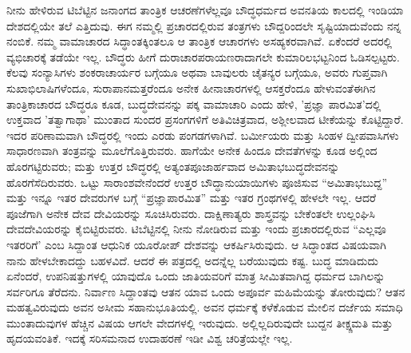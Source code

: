 ನೀನು ಹೇಳಿರುವ ಟಿಬೆಟ್ಟಿನ ಜನಾಂಗದ ತಾಂತ್ರಿಕ ಆಚರಣೆಗಳೆಲ್ಲವೂ ಬೌದ್ಧಧರ್ಮದ ಅವನತಿಯ ಕಾಲದಲ್ಲಿ ಇಂಡಿಯಾ ದೇಶದಲ್ಲಿಯೇ ತಲೆ ಎತ್ತಿದುವು. ಈಗ ನಮ್ಮಲ್ಲಿ ಪ್ರಚಾರದಲ್ಲಿರುವ ತಂತ್ರಗಳು ಬೌದ್ದರಿಂದಲೇ ಸೃಷ್ಟಿಯಾದುವೆಂದು ನನ್ನ ನಂಬಿಕೆ. ನಮ್ಮ ವಾಮಾಚಾರದ ಸಿದ್ಧಾಂತಕ್ಕಿಂತಲೂ ಆ ತಾಂತ್ರಿಕ ಆಚಾರಗಳು ಅಸಹ್ಯಕರವಾಗಿವೆ. ಏಕೆಂದರೆ ಅದರಲ್ಲಿ ವ್ಯಭಿಚಾರಕ್ಕೆ ತಡೆಯೇ ಇಲ್ಲ. ಬೌದ್ಧರು ಹೀಗೆ ದುರಾಚಾರಪರಾಯಣರಾದಾಗಲೇ ಕುಮಾರಿಲಭಟ್ಟನಿಂದ ಓಡಿಸಲ್ಪಟ್ಟರು. ಕೆಲವು ಸಂನ್ಯಾಸಿಗಳು ಶಂಕರಾಚಾರ್ಯರ ಬಗ್ಗೆಯೂ ಅಥವಾ ಬಾವುಲರು ಚೈತನ್ಯರ ಬಗ್ಗೆಯೂ, ಅವರು ಗುಪ್ತವಾಗಿ ಸುಖಾಭಿಲಾಷಿಗಳೆಂದೂ, ಸುರಾಪಾನಮತ್ತರೆಂದೂ ಅನೇಕ ಹೀನಾಚಾರಗಳಲ್ಲಿ ಆಸಕ್ತರೆಂದೂ ಹೇಳುವಂತೆ\enginline{-}ಈಗಿನ ತಾಂತ್ರಿಕಾಚಾರದ ಬೌದ್ಧರೂ ಕೂಡ, ಬುದ್ಧದೇವನನ್ನು ಪಕ್ಕ ವಾಮಾಚಾರಿ ಎಂದು ಹೇಳಿ, 'ಪ್ರಜ್ಞಾ ಪಾರಮಿತ'ದಲ್ಲಿ ಉಕ್ತವಾದ 'ತತ್ವಾಗಾಥಾ' ಮುಂತಾದ ಸುಂದರ ಪ್ರಸಂಗಗಳಿಗೆ ಅತಿವಿಚಿತ್ರವಾದ, ಅಶ್ಲೀಲವಾದ ಟೀಕೆಯನ್ನು ಕೊಟ್ಟಿದ್ದಾರೆ. ಇದರ ಪರಿಣಾಮವಾಗಿ ಬೌದ್ಧರಲ್ಲಿ ಇಂದು ಎರಡು ಪಂಗಡಗಳಾಗಿವೆ. ಬರ್ಮೀಯರು ಮತ್ತು ಸಿಂಹಳ ದ್ವೀಪವಾಸಿಗಳು ಸಾಧಾರಣವಾಗಿ ತಂತ್ರವನ್ನು ಮೂಲೆಗೊತ್ತಿರುವರು. ಹಾಗೆಯೇ ಅನೇಕ ಹಿಂದೂ ದೇವತೆಗಳನ್ನು ಕೂಡ ಅಲ್ಲಿಂದ ಹೊರಗಟ್ಟಿರುವರು; ಮತ್ತು ಉತ್ತರ ಬೌದ್ಧರಲ್ಲಿ ಅತ್ಯಂತ\break ಪೂಜಾರ್ಹವಾದ ಅಮಿತಾಭಬುದ್ಧದೇವನನ್ನು ಹೊರಗೆಸೆದಿರುವರು. ಒಟ್ಟು ಸಾರಾಂಶವೇನೆಂದರೆ ಉತ್ತರ ಬೌದ್ಧಾನುಯಾಯಿಗಳು ಪೂಜಿಸುವ “ಅಮಿತಾಭಬುದ್ದ” ಮತ್ತು ಇನ್ನೂ ಇತರ ದೇವರುಗಳ ಬಗ್ಗೆ ``ಪ್ರಜ್ಞಾಪಾರಮಿತ'' ಮತ್ತು ಇತರ ಗ್ರಂಥಗಳಲ್ಲಿ ಹೇಳಲೇ ಇಲ್ಲ. ಆದರೆ ಪೂಜೆಗಾಗಿ ಅನೇಕ ದೇವ ದೇವಿಯರನ್ನು ಸೂಚಿಸಿರುವರು. ದಾಕ್ಷಿಣಾತ್ಯರು ಶಾಸ್ತ್ರವನ್ನು ಬೇಕೆಂತಲೇ ಉಲ್ಲಂಘಿಸಿ ದೇವದೇವಿಯರನ್ನು ಕೈಬಿಟ್ಟಿರುವರು. ಟಿಬೆಟ್ಟಿನಲ್ಲಿ ನೀನು ನೋಡಿರುವ ಮತ್ತು ಇಂದು ಪ್ರಚಾರದಲ್ಲಿರುವ ``ಎಲ್ಲವೂ ಇತರರಿಗೆ' ಎಂಬ ಸಿದ್ದಾಂತ ಆಧುನಿಕ ಯೂರೋಪ್ ದೇಶವನ್ನು ಆಕರ್ಷಿಸಿರುವುದು. ಆ ಸಿದ್ಧಾಂತದ ವಿಷಯವಾಗಿ ನಾನು ಹೇಳಬೇಕಾದದ್ದು ಬಹಳವಿದೆ. ಆದರೆ ಈ ಪತ್ರದಲ್ಲಿ ಅದನ್ನೆಲ್ಲ ಬರೆಯುವುದು ಕಷ್ಟ. ಬುದ್ಧ ಮಾಡಿದುದು ಏನೆಂದರೆ, ಉಪನಿಷತ್ತುಗಳಲ್ಲಿ ಯಾವುದೊ ಒಂದು ಜಾತಿಯವರಿಗೆ ಮಾತ್ರ ಸೀಮಿತವಾಗಿದ್ದ ಧರ್ಮದ ಬಾಗಿಲನ್ನು ಸರ್ವರಿಗೂ ತೆರೆದನು. ನಿರ್ವಾಣ ಸಿದ್ದಾಂತವು ಆತನ ಯಾವ ಒಂದು ಅಪೂರ್ವ ಮಹಿಮೆಯನ್ನು ತೋರುವುದು? ಆತನ ಮಹತ್ವವಿರುವುದು ಅವನ ಅಸೀಮ ಸಹಾನುಭೂತಿಯಲ್ಲಿ. ಅವನ ಧರ್ಮಕ್ಕೆ ಕಳೆಕೊಡುವ ಮೇಲಿನ ದರ್ಜೆಯ ಸಮಾಧಿ ಮುಂತಾದುವುಗಳ ಹೆಚ್ಚಿನ ವಿಷಯ ಆಗಲೇ ವೇದಗಳಲ್ಲಿ ಇರುವುದು. ಅಲ್ಲಿಲ್ಲದಿರುವುದೇ ಬುದ್ದನ ತೀಕ್ಷ್ಣಮತಿ ಮತ್ತು ಹೃದಯವಂತಿಕೆ. ಇದಕ್ಕೆ ಸರಿಸಮನಾದ ಉದಾಹರಣೆ ಇಡೀ ವಿಶ್ವ ಚರಿತ್ರೆಯಲ್ಲೇ ಇಲ್ಲ.

